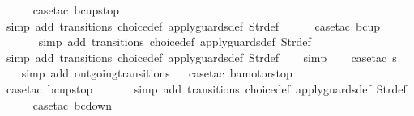 \begin{isabellebody}
\ \ \ \ \isamarkupfalse%
\ {\isacharparenleft}case{\isacharunderscore}tac\ {\isachardoublequoteopen}bc{\isacharequal}up{}{}stop{\isachardoublequoteclose}{\isacharparenright}\isanewline
\ \ \ \ \ \isamarkupfalse%
\ {\isacharparenleft}simp\ add{\isacharcolon}\ transitions\ choice{\isacharunderscore}def\ apply{\isacharunderscore}guards{\isacharunderscore}def\ Str{\isacharunderscore}def{\isacharparenright}\isanewline
\ \ \ \ \isamarkupfalse%
\ {\isacharparenleft}case{\isacharunderscore}tac\ {\isachardoublequoteopen}bc{\isacharequal}up{}{}{\isachardoublequoteclose}{\isacharparenright}\isanewline
\ \ \ \ \ \isamarkupfalse%
\ {\isacharparenleft}simp\ add{\isacharcolon}\ transitions\ choice{\isacharunderscore}def\ apply{\isacharunderscore}guards{\isacharunderscore}def\ Str{\isacharunderscore}def{\isacharparenright}\isanewline
\ \ \ \ \isamarkupfalse%
\ {\isacharparenleft}simp\ add{\isacharcolon}\ transitions\ choice{\isacharunderscore}def\ apply{\isacharunderscore}guards{\isacharunderscore}def\ Str{\isacharunderscore}def{\isacharparenright}\isanewline
\ \ \isamarkupfalse%
\ simp\isanewline
\ \ \isamarkupfalse%
\ {\isacharparenleft}case{\isacharunderscore}tac\ {\isachardoublequoteopen}s{\isacharequal}{}{\isachardoublequoteclose}{\isacharparenright}\isanewline
\ \ \isamarkupfalse%
\ {\isacharparenleft}simp\ add{\isacharcolon}\ outgoing{\isacharunderscore}transitions{\isacharunderscore}{}{\isacharparenright}\isanewline
\ \isamarkupfalse%
\ {\isacharparenleft}case{\isacharunderscore}tac\ {\isachardoublequoteopen}ba{\isacharequal}motorstop{}{\isachardoublequoteclose}{\isacharparenright}\isanewline
\ \ \ \ \isamarkupfalse%
\ {\isacharparenleft}case{\isacharunderscore}tac\ {\isachardoublequoteopen}bc{\isacharequal}up{}{}stop{\isachardoublequoteclose}{\isacharparenright}\isanewline
\ \ \ \ \ \isamarkupfalse%
\ {\isacharparenleft}simp\ add{\isacharcolon}\ transitions\ choice{\isacharunderscore}def\ apply{\isacharunderscore}guards{\isacharunderscore}def\ Str{\isacharunderscore}def{\isacharparenright}\isanewline
\ \ \ \ \isamarkupfalse%
\ {\isacharparenleft}case{\isacharunderscore}tac\ {\isachardoublequoteopen}bc{\isacharequal}down{}{}{\isachardoublequoteclose}{\isacharparenright}\isanewline
\ \ \ \ \ \isamarkupfalse%

\end{isabellebody}
